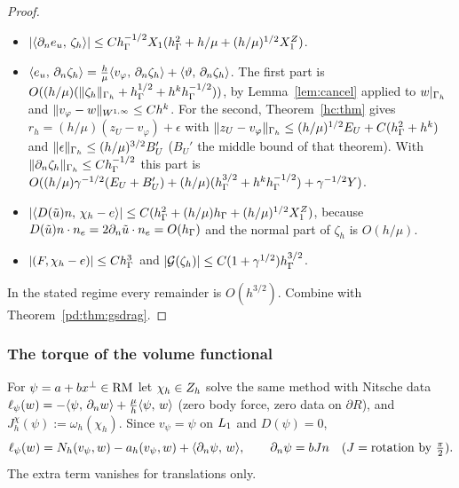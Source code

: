 \begin{proof}
\begin{itemize}
\item $|\langle \partial_n e_u,\, \zeta_h\rangle|\le Ch_\Gamma^{-1/2}X_1(h_\Gamma^2+h/\mu+(h/\mu)^{1/2}X_1^Z)$.
\item $\langle e_u,\, \partial_n\zeta_h\rangle=\frac h\mu\langle v_\varphi,\, \partial_n\zeta_h\rangle+\langle \vartheta,\, \partial_n\zeta_h\rangle$. The first part is $O((h/\mu)(\lVert \zeta_h\rVert_{\Gamma_h}+h_\Gamma^{1/2}+h^kh_\Gamma^{-1/2}))$, by Lemma~\ref{lem:cancel} applied to $w|_{\Gamma_h}$ and $\lVert v_\varphi-w\rVert_{W^{1,\infty}}\le Ch^k$. For the second, Theorem~\ref{hc:thm} gives $r_h=(h/\mu)(z_U-v_\varphi)+\epsilon$ with $\lVert z_U-v_\varphi\rVert_{\Gamma_h}\le(h/\mu)^{1/2}E_U+C(h_\Gamma^2+h^k)$ and $\lVert \epsilon\rVert_{\Gamma_h}\le(h/\mu)^{3/2}B_U'$ ($B_U'$ the middle bound of that theorem). With $\lVert \partial_n\zeta_h\rVert_{\Gamma_h}\le Ch_\Gamma^{-1/2}$ this part is $O((h/\mu)\gamma^{-1/2}(E_U+B'_U)+(h/\mu)(h_\Gamma^{3/2}+h^kh_\Gamma^{-1/2})+\gamma^{-1/2}Y)$.
\item $|\langle D(\tilde u)n,\, \chi_h-e\rangle|\le C(h_\Gamma^2+(h/\mu)h_\Gamma+(h/\mu)^{1/2}X_1^Z)$, because $D(\tilde u)n\cdot n_e=2\partial_n\tilde u\cdot n_e=O(h_\Gamma)$ and the normal part of $\zeta_h$ is $O(h/\mu)$.
\item $|(F,\chi_h-e)|\le Ch_\Gamma^3$ and $|\mathcal G(\zeta_h)|\le C(1+\gamma^{1/2})h_\Gamma^{3/2}$.
\end{itemize}
In the stated regime every remainder is $O(h^{3/2})$. Combine with Theorem~\ref{pd:thm:gsdrag}.
\end{proof}

\subsubsection{The torque of the volume functional}
For $\psi=a+bx^\perp\in\mathrm{RM}$ let $\chi_h\in Z_h$ solve the same method with Nitsche data $\ell_\psi(w)=-\langle \psi,\, \partial_n w\rangle+\frac\mu h\langle \psi,\, w\rangle$ (zero body force, zero data on $\partial R$), and $J^\chi_h(\psi):=\omega_h(\chi_h)$. Since $v_\psi=\psi$ on $L_1$ and $D(\psi)=0$,
\[
\ell_\psi(w)=N_h(v_\psi,w)-a_h(v_\psi,w)+\langle \partial_n\psi,\, w\rangle,\qquad\partial_n\psi=bJn\quad(J=\text{rotation by }\tfrac\pi2).
\]
The extra term vanishes for translations only.

